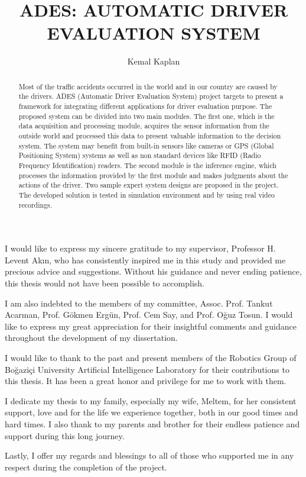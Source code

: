 \documentclass[a4paper,oneside,12pt]{report}
\title{ADES: AUTOMATIC DRIVER EVALUATION SYSTEM}
\author{Kemal Kaplan}
\begin{document}
\lstset{language=Java}


\makephdtitle


\makeapprovalpage

\begin{acknowledgements}
I would like to express my sincere gratitude to my supervisor, Professor H. Levent Ak{\i}n, who has consistently inspired me in this study and provided me precious advice and suggestions. Without his guidance and never ending patience, this thesis would not have been possible to accomplish.

I am also indebted to the members of my committee, Assoc. Prof. Tankut Acarman, Prof. G\"okmen Erg\"un, Prof. Cem Say, and Prof. O\u{g}uz Tosun. I would like to express my great appreciation for their insightful comments and guidance throughout the development of my dissertation.

I would like to thank to the past and present members of the Robotics Group of  Bo{\u g}azi{\c c}i University Artificial Intelligence Laboratory for their contributions to this thesis. It has been a great honor and privilege for me to work with them. 

I dedicate my thesis to my family, especially my wife, Meltem, for her consistent support, love and for the life we experience together, both in our good times and hard times. I also thank to my parents and brother for their endless patience and support during this long journey.

Lastly, I offer my regards and blessings to all of those who supported me in any respect during the completion of the project.

\end{acknowledgements}

\begin{abstract}
Most of the traffic accidents occurred in the world and in our country are caused by the drivers. ADES (Automatic Driver Evaluation System) project targets to present a framework for integrating different applications for driver evaluation purpose. The proposed system can be divided into two main modules. The first one, which is the data acquisition and processing module, acquires the sensor information from the outside world and processed this data to present valuable information to the decision system. The system may benefit from built-in sensors like cameras or GPS (Global Positioning System) systems as well as non standard devices like RFID (Radio Frequency Identification) readers. The second module is the inference engine, which processes the information provided by the first module and makes judgments about the actions of the driver. Two sample expert system designs are proposed in the project. The developed solution is tested in simulation environment and by using real video recordings.
\end{abstract}
\end{document}
